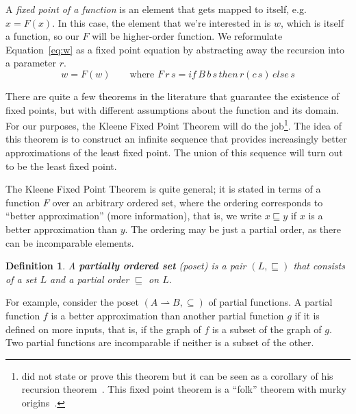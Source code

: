 \documentclass{tufte-handout}
\newtheorem{definition}{Definition}%
\begin{document}
A \emph{fixed point of a function} is an element that gets mapped to
itself, e.g. $x = F(x)$. In this case, the element that we're
interested in is $w$, which is itself a function, so our $F$ will be
higher-order function. We reformulate Equation~\ref{eq:w} as a fixed
point equation by abstracting away the recursion into a parameter $r$.
\begin{equation} \label{eq:while}
  w = F(w)
  \qquad
  \text{where }
  F\,r\,s = \mathit{if}\, B\,b\,s \,\mathit{then}\, r(c\,s)\,\mathit{else}\,s
\end{equation}

There are quite a few theorems in the literature that guarantee the
existence of fixed points, but with different assumptions about the
function and its domain. For our purposes, the Kleene Fixed Point
Theorem will do the job\footnote{\citet{Kleene:1952aa} did not state
  or prove this theorem but it can be seen as a corollary of his
  recursion theorem~\citep{Amadio:1998fk}. This fixed point theorem is
  a ``folk'' theorem with murky origins~\citep{Lassez:1982aa}.}. The
idea of this theorem is to construct an infinite sequence that
provides increasingly better approximations of the least fixed
point. The union of this sequence will turn out to be the least fixed
point.

The Kleene Fixed Point Theorem is quite general; it is stated in terms
of a function $F$ over an arbitrary ordered set, where the ordering
corresponds to ``better approximation'' (more information), that is,
we write $x \sqsubseteq y$ if $x$ is a better approximation than
$y$. The ordering may be just a partial order, as there can be
incomparable elements.

\begin{definition}
  A \textbf{\emph{partially ordered set}} (poset) is a pair
  $(L,\sqsubseteq)$ that consists of a set $L$ and a partial order
  $\sqsubseteq$ on $L$.
\end{definition}

%
For example, consider the poset $(A{\rightharpoonup}B, \subseteq)$ of
partial functions. A partial function $f$ is a better approximation
than another partial function $g$ if it is defined on more inputs,
that is, if the graph of $f$ is a subset of the graph of $g$.  Two
partial functions are incomparable if neither is a subset of the
other.
\end{document}

